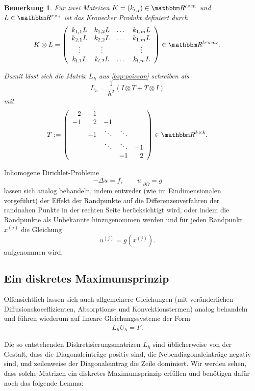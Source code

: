 \documentclass[12pt,a4paper]{book}
\theoremstyle{break}
\newtheorem{bemerkung}[theorem]{Bemerkung}
\theoremstyle{nonumberplain}
\newcommand{\R}{\mathbbm R}
\newcommand{\1}{\mathbbm{1}} 			      	%
\begin{document}
\begin{bemerkung}
Für zwei Matrizen $K=(k_{i,j})\in \R^{l \times m}$ und $L\in \R^{r \times s}$ ist das \emph{Kronecker Produkt} definiert durch
\[
K\otimes L =  \left( \begin{array}{c c c c} k_{1,1} L & k_{1,2}L & \dots & k_{1,m}L \\ k_{2,1} L & k_{2,2}L & \dots & k_{1,m}L \\ \vdots & \vdots & & \vdots\\
k_{l,1} L & k_{l,2}L & \dots & k_{l,m}L\end{array} \right) \in \R^{lr\times ms}.
\]

Damit lässt sich die Matrix $L_h$ aus \ref{bsp:poisson} schreiben als
\[
L_h=\frac{1}{h^2} \left( I \otimes T + T \otimes I \right)
\]
mit
\[
T:=\left( \begin{array}{r r r r r} 2 & -1\\ -1 & 2 & -1\\ & -1 & \ddots & \ddots\\ & & \ddots & \ddots & -1\\ & & & -1 & 2\end{array}\right)\in \R^{k\times k}.
\]
\end{bemerkung}

Inhomogene Dirichlet-Probleme
\[
-\Delta u =f, \qquad u|_{\partial \Omega}=g
\]
lassen sich analog behandeln, indem entweder (wie im Eindimensionalen vorgeführt) der Effekt der Randpunkte auf die Differenzenverfahren der randnahen Punkte  
in der rechten Seite berücksichtigt wird, oder indem die Randpunkte als Unbekannte hinzugenommen werden und für jeden Randpunkt $x^{(j)}$
die Gleichung
\[
u^{(j)}=g(x^{(j)}).
\]
aufgenommen wird.


\subsection{Ein diskretes Maximumsprinzip}

Offensichtlich lassen sich auch allgemeinere Gleichungen (mit veränderlichen Diffusionskoeeffizienten, Absorptions- und Konvektionstermen)
analog behandeln und führen wiederum auf lineare Gleichungssysteme der Form
\begin{align*}
L_h U_h =F.
\end{align*}

Die so entstehenden Diskretisierungsmatrizen $L_h$ sind üblicherweise von der Gestalt, dass die Diagonaleinträge positiv sind, die Nebendiagonaleinträge
negativ sind, und zeilenweise der Diagonaleintrag die Zeile dominiert. 
Wir werden sehen, dass solche Matrizen ein diskretes Maximumsprinzip erfüllen und benötigen dafür noch das folgende Lemma:
\end{document}
